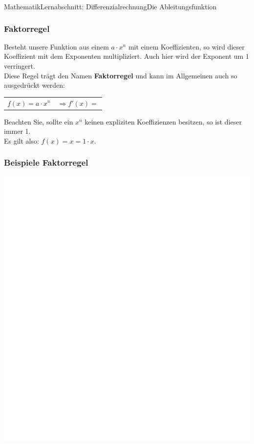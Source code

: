 \documentclass[11pt,twocolumn,oneside,openany,headings=optiontotoc,11pt,numbers=noenddot]{article}
\begin{document}
\begin{worksheet}{Mathematik}{Lernabschnitt: Differenzialrechnung}{Die Ableitungsfunktion}
		\subsubsection{Faktorregel}
		Besteht unsere Funktion aus einem \(a\cdot x^n\) mit einem Koeffizienten, so wird dieser Koeffizient mit dem Exponenten multipliziert. Auch hier wird der Exponent um \(1\) verringert.\\
		Diese Regel trägt den Namen \textbf{Faktorregel} und kann im Allgemeinen auch so ausgedrückt werden:
		\begin{framed}
			\noindent
			\begin{tabularx}{0.8\textwidth}{XX}
				\(f(x) = a\cdot x^n\) & \(\Rightarrow f'(x) = \)
			\end{tabularx}
		\end{framed}
		\color{codegray} Beachten Sie, sollte ein \(x^n\) keinen expliziten Koeffizienzen besitzen, so ist dieser immer 1.\\
		Es gilt also: \colorbox{green!5}{\(f(x) = x = 1\cdot x\)}.
		\normalcolor
		\subsubsection*{Beispiele Faktorregel}
		\includegraphics[scale=0.2]{../../empty.jpg}\\

\end{worksheet}
\end{document}
